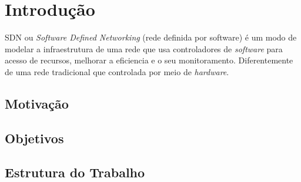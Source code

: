 \chapter{Introdução}
\label{cap:intro}

SDN ou \textit{Software Defined Networking} (rede definida por software) é um modo de modelar a infraestrutura de uma rede que usa
controladores de \textit{software} para acesso de recursos, melhorar a eficiencia e o seu monitoramento. Diferentemente de uma rede tradicional que controlada por meio de \textit{hardware}.


\section{Motivação}
\label{sec:motivacao}

\lipsum[2]

\section{Objetivos}
\label{sec:objetivos}

\lipsum[2]

\section{Estrutura do Trabalho}
\label{sec:estrutura}

\lipsum[1]